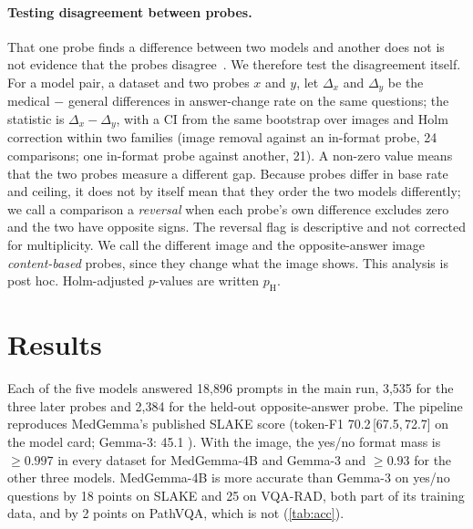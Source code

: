 \documentclass[10pt,twocolumn,letterpaper]{article}
\newcommand{\ci}[2]{\,[#1,\,#2]}  %
\begin{document}
\paragraph{Testing disagreement between probes.} That one probe finds a difference between two models and another
does not is not evidence that the probes disagree~\cite{gelman2006difference}. We therefore test the disagreement
itself. For a model pair, a dataset and two probes $x$ and $y$, let $\Delta_x$ and $\Delta_y$ be the medical $-$
general differences in answer-change rate on the same questions; the statistic is $\Delta_x-\Delta_y$, with a CI
from the same bootstrap over images and Holm correction within two families (image removal against an in-format
probe, 24 comparisons; one in-format probe against another, 21). A non-zero value means that the two probes
measure a different gap. Because probes differ in base rate and ceiling, it does not by itself mean that they order
the two models differently; we call a comparison a \emph{reversal} when each probe's own difference excludes zero
and the two have opposite signs. The reversal flag is descriptive and not corrected for multiplicity. We call the
different image and the opposite-answer image \emph{content-based} probes, since they change what the image shows.
This analysis is post hoc. Holm-adjusted $p$-values are written $p_{\text{H}}$.

\section{Results}
\label{sec:results}
Each of the five models answered 18,896 prompts in the main run, 3,535 for the three later probes and 2,384 for
the held-out opposite-answer probe. The pipeline reproduces MedGemma's published SLAKE score (token-F1
70.2\ci{67.5}{72.7}  on the model card; Gemma-3: 45.1 ). With the image, the yes/no format mass is
$\ge0.997$ in every dataset for MedGemma-4B and Gemma-3 and $\ge0.93$ for the other three models. MedGemma-4B is
more accurate than Gemma-3 on yes/no questions by 18 points on SLAKE and 25 on VQA-RAD, both part of its training
data, and by 2 points on PathVQA, which is not (\cref{tab:acc}).
\end{document}
